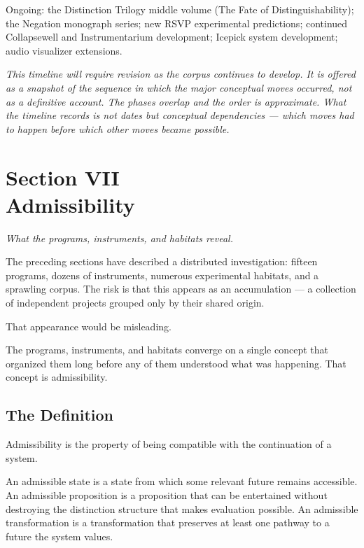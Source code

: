 \documentclass[12pt, openany]{book}
\begin{document}
Ongoing: the Distinction Trilogy middle volume (The Fate of
Distinguishability); the Negation monograph series; new RSVP experimental
predictions; continued Collapsewell and Instrumentarium development;
Icepick system development; audio visualizer extensions.

\bigskip

\noindent\textit{This timeline will require revision as the corpus
continues to develop. It is offered as a snapshot of the sequence in
which the major conceptual moves occurred, not as a definitive account.
The phases overlap and the order is approximate. What the timeline records
is not dates but conceptual dependencies — which moves had to happen
before which other moves became possible.}

\cleardoublepage

\chapter[Admissibility: A Synthesis]{Section VII \\ Admissibility}

\noindent\textit{What the programs, instruments, and habitats reveal.}

\bigskip

\noindent The preceding sections have described a distributed investigation:
fifteen programs, dozens of instruments, numerous experimental habitats, and
a sprawling corpus. The risk is that this appears as an accumulation — a
collection of independent projects grouped only by their shared origin.

That appearance would be misleading.

The programs, instruments, and habitats converge on a single concept that
organized them long before any of them understood what was happening. That
concept is admissibility.

\section{The Definition}

Admissibility is the property of being compatible with the continuation of
a system.

An admissible state is a state from which some relevant future remains
accessible. An admissible proposition is a proposition that can be
entertained without destroying the distinction structure that makes
evaluation possible. An admissible transformation is a transformation that
preserves at least one pathway to a future the system values.
\end{document}
